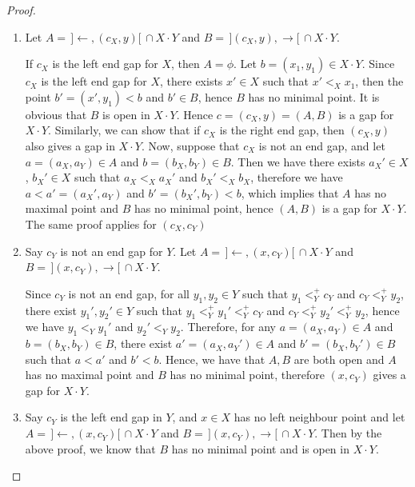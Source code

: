 \documentclass[12pt,oneside,english]{amsbook}
\numberwithin{equation}{section} %
\numberwithin{figure}{section} %
\theoremstyle{plain}
\numberwithin{section}{chapter}
\theoremstyle{plain}
\begin{document}
\begin{proof}


  \begin{enumerate}
  \item Let $A  = \, ] \leftarrow, (c_{X},y) [ \, \cap X \cdot Y$ and $B  = \, ](c_{X},y), \rightarrow [ \, \cap X \cdot Y $.
    
    If $c_{X}$ is the left end gap for $X$, then $A  =  \phi$. Let $b = (x_{1},y_{1})  \in X \cdot Y$. Since $c_{X}$ is the left end gap for $X$, there exists $x'  \in  X$ such that $x' <_{X} x_{1}$, then the point $b'  =  (x',y_{1}) < b$ and $b'  \in  B$, hence $B$ has no minimal point. It is obvious that $B$ is open in $X \cdot Y$. Hence $c  =  (c_{X},y)  =  (A,B) $ is a gap for $X \cdot Y$. Similarly, we can show that if $c_{X}$ is the right end gap, then $(c_{X}, y)$ also gives a gap in $X \cdot Y$.
    Now, suppose that $c_{X}$ is not an end gap, and let $a  =  (a_{X}, a_{Y})  \in  A$ and $b  =  (b_{X},b_{Y})  \in  B$. Then we have there exists $a_{X}'  \in  X$, $b_{X}'  \in  X$ such that $a_{X} <_{X} a_{X}'$ and $b_{X}' <_{X} b_{X}$, therefore we have $a < a'  =  (a_{X}',a_{Y})$ and $b'  =  (b_{X}',b_{Y}) < b$, which implies that $A$ has no maximal point and $B$ has no minimal point, hence $(A,B)$ is a gap for $X \cdot Y$. The same proof applies for $(c_{X},c_{Y})$
    
  \item Say $c_{Y}$ is not an end gap for $Y$. Let $A  = \,  ] \leftarrow, (x,c_{Y}) [ \, \cap X \cdot Y$ and $B  = \, ] (x,c_{Y}), \rightarrow [ \, \cap X \cdot Y$.
    
    Since $c_{Y}$ is not an end gap, for all $y_{1},y_{2}  \in  Y$ such that $y_{1} <_{Y}^+ c_{Y}$ and $ c_{Y} <_{Y}^+ y_{2} $, there exist $y_{1}', y_{2}'  \in  Y$ such that $y_{1} <_{Y}^+ y_{1}' <_{Y}^+ c_{Y}$ and $c_{Y} <_{Y}^+ y_{2}' <_{Y}^+ y_{2}$, hence we have $y_{1} <_{Y} y_{1}'$ and $y_{2}' <_{Y} y_{2}$.
    Therefore, for any $a  =  (a_{X},a_{Y})  \in  A$ and $b  =  (b_{X},b_{Y})  \in  B$, there exist $a'  =  (a_{X}, a_{Y}')  \in  A$ and $b'  =  (b_{X},b_{Y}')  \in B$ such that $a < a'$ and $b' < b$.
    Hence, we have that $A,B$ are both open and $A$ has no maximal point and $B$ has no minimal point, therefore $(x,c_{Y})$ gives a gap for $X \cdot Y$.
  \item Say $c_{Y}$ is the left end gap in $Y$, and $x  \in  X$ has no left neighbour point and let $A  = \,  ] \leftarrow, (x,c_{Y}) [ \, \cap X \cdot Y$ and $B  = \, ] (x , c_{Y}), \rightarrow [ \, \cap X \cdot Y$. Then by the above proof, we know that $B$ has no minimal point and is open in $X \cdot Y$.
    

\end{enumerate}
\end{proof}
\end{document}
